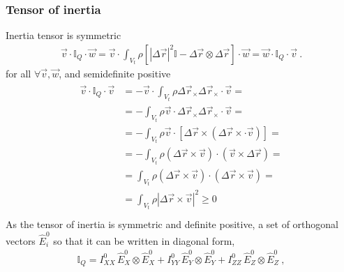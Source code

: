 \documentclass[letterpaper,10pt,english]{jupyterBook}
\begin{document}
\subsubsection{Tensor of inertia}
\label{\detokenize{ch/inertia:tensor-of-inertia}}
\sphinxAtStartPar
{} Inertia tensor is symmetric
\begin{equation*}
\begin{split}\vec{v} \cdot \mathbb{I}_Q \cdot \vec{w} = \vec{v} \cdot \int_{V_t} \rho \left[ |\Delta \vec{r}|^2 \mathbb{I} - \Delta \vec{r} \otimes \Delta \vec{r} \right] \cdot \vec{w} = \vec{w} \cdot \mathbb{I}_Q \cdot \vec{v} \ .\end{split}
\end{equation*}
\sphinxAtStartPar
for all \(\forall \vec{v}, \vec{w}\), and semi\sphinxhyphen{}definite positive
\begin{equation*}
\begin{split}\begin{aligned}
  \vec{v} \cdot \mathbb{I}_Q \cdot \vec{v} 
  & = - \vec{v} \cdot \int_{V_t} \rho \Delta \vec{r}_{\times} \Delta \vec{r}_{\times} \cdot \vec{v} = \\
  & = - \int_{V_t} \rho \vec{v} \cdot \Delta \vec{r}_{\times} \Delta \vec{r}_{\times} \cdot \vec{v} = \\
  & = - \int_{V_t} \rho \vec{v} \cdot \left[ \Delta \vec{r} \times \left( \Delta \vec{r} \times \cdot \vec{v} \right) \right] = \\
  & = - \int_{V_t} \rho \left( \Delta \vec{r} \times \vec{v} \right) \cdot \left( \vec{v} \times  \Delta \vec{r} \right) = \\
  & =   \int_{V_t} \rho \left( \Delta \vec{r} \times \vec{v} \right) \cdot \left( \Delta \vec{r} \times \vec{v} \right) = \\
  & =   \int_{V_t} \rho | \Delta \vec{r} \times \vec{v} |^2 \ge 0 \\
\end{aligned}\end{split}
\end{equation*}
\sphinxAtStartPar
{} As the tensor of inertia is symmetric and definite positive, a set of orthogonal vectors \(\hat{E}^0_i\) so that it can be written in diagonal form,
\begin{equation*}
\begin{split}\mathbb{I}_Q = I^0_{XX} \, \hat{E}^0_X \otimes \hat{E}^0_X +  I^0_{YY} \, \hat{E}^0_Y \otimes \hat{E}^0_Y + I^0_{ZZ} \, \hat{E}^0_Z \otimes \hat{E}^0_Z \ ,\end{split}
\end{equation*}
\end{document}
